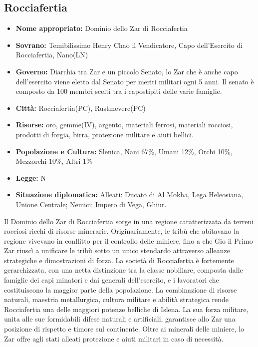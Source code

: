 \documentclass[a4paper]{report}
\begin{document}
\begin{multicols}{2}
\subsection*{Rocciafertia}
\begin{itemize}
	\item \textbf{Nome appropriato:} Dominio dello Zar di Rocciafertia
	\item \textbf{Sovrano:} Temibilissimo Henry Chao il Vendicatore, Capo dell'Esercito di Rocciafertia, Nano(LN)
	\item \textbf{Governo:} Diarchia tra Zar e un piccolo Senato, lo Zar che è anche capo dell'esercito viene eletto dal Senato per meriti militari ogni 5 anni. Il senato è composto da 100 membri scelti tra i capostipiti delle varie famiglie.
	\item \textbf{Città:} Rocciafertia(PC), Rustmeverc(PC)
	\item \textbf{Risorse:} oro, gemme(IV), argento, materiali ferrosi, materiali rocciosi, prodotti di forgia, birra, protezione militare e aiuti bellici.
	\item \textbf{Popolazione e Cultura:} Slenica, Nani 67\%, Umani 12\%, Orchi 10\%, Mezzorchi 10\%, Altri 1\%
	\item \textbf{Legge:} N
	\item \textbf{Situazione diplomatica:} Alleati: Ducato di Al Mokha, Lega Heleosiana, Unione Centrale; Nemici: Impero di Vega, Ghiur.
\end{itemize}
Il Dominio dello Zar di Rocciafertia sorge in una regione caratterizzata da terreni rocciosi ricchi di risorse minerarie. Originariamente, le tribù che abitavano la regione vivevano in conflitto per il controllo delle miniere, fino a che Gio il Primo Zar riuscì a unificare le tribù sotto un unico stendardo attraverso alleanze strategiche e dimostrazioni di forza. 
La società di Rocciafertia è fortemente gerarchizzata, con una netta distinzione tra la classe nobiliare, composta dalle famiglie dei capi minatori e dai generali dell'esercito, e i lavoratori che costituiscono la maggior parte della popolazione. La combinazione di risorse naturali, maestria metallurgica, cultura militare e abilità strategica rende Rocciafertia una delle maggiori potenze belliche di Islena. La sua forza militare, unita alle sue formidabili difese naturali e artificiali, garantisce allo Zar una posizione di rispetto e timore sul continente. Oltre ai minerali delle miniere, lo Zar offre agli stati alleati protezione e aiuti militari in caso di necessità.


\end{multicols}
\end{document}
